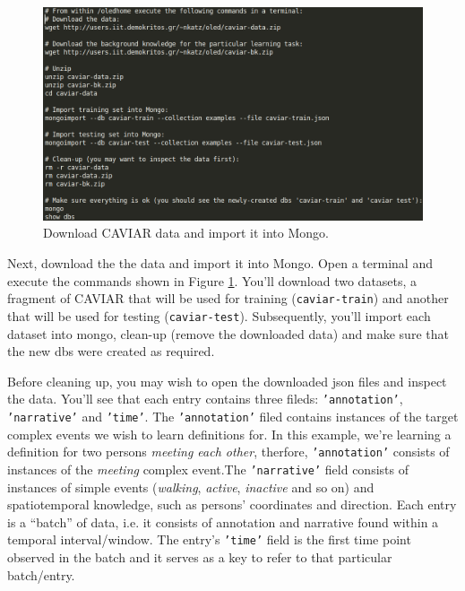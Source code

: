 \documentclass[12pt]{article}
\begin{document}
\begin{figure}[h]
\centering
\includegraphics[width=1\textwidth]{./figures/download-caviar}
\caption{Download CAVIAR data and import it into Mongo.}%
\label{fig:caviar}
\end{figure}

Next, download the the data and import it into Mongo. Open a terminal and execute the commands shown in Figure \ref{fig:caviar}. You'll download two datasets, a fragment of CAVIAR that will be used for training (\texttt{caviar-train}) and another that will be used for testing (\texttt{caviar-test}). Subsequently, you'll import each dataset into mongo, clean-up (remove the downloaded data) and make sure that the new dbs were created as required. 

Before cleaning up, you may wish to open the downloaded json files and inspect the data. You'll see that each entry contains three fileds: \texttt{'annotation'}, \texttt{'narrative'} and \texttt{'time'}. The \texttt{'annotation'} filed contains instances of the target complex events we wish to learn definitions for. In this example, we're learning a definition for two persons \emph{meeting each other}, therfore, \texttt{'annotation'} consists of instances of the \emph{meeting} complex event.\linebreak The \texttt{'narrative'} field consists of instances of simple events (\emph{walking}, \emph{active}, \emph{inactive} and so on) and spatiotemporal knowledge, such as persons' coordinates and direction. Each entry is a ``batch'' of data, i.e. it consists of annotation and narrative found within a temporal interval/window. The entry's \texttt{'time'} field is the first time point observed in the batch and it serves as a key to refer to that particular batch/entry.     
\end{document}
